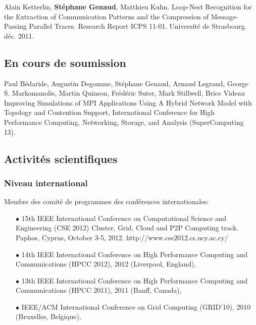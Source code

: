 \documentclass[11pt]{article}
\begin{document}
\begin{thebibliography}{99}
Alain Ketterlin, \textbf{Stéphane Genaud}, Matthieu Kuhn.
\newblock Loop-Nest Recognition for the Extraction of Communication Patterns 
and the Compression of Message-Passing Parallel Traces.
\newblock Research Report ICPS 11-01. Université de Strasbourg. déc. 2011.


\subsection*{En cours de soumission}

Paul Bédaride, Augustin Degomme, Stéphane Genaud, Arnaud Legrand, George S. Markomanolis,
Martin Quinson, Frédéric Suter, Mark Stillwell, Brice Videau
\newblock
Improving Simulations of MPI Applications Using A Hybrid Network Model with Topology and Contention Support,
International Conference for High Performance Computing, Networking, Storage, and Analysis (SuperComputing 13).
\end{thebibliography}


\subsection{Activités scientifiques}

\subsubsection{Niveau international}
Membre des comité de programmes des conférences internationales:\\[-3mm]
\begin{itemize}
\item[$\bullet$]
15th IEEE International Conference on Computational Science and Engineering (CSE 2012) 
Cluster, Grid, Cloud and P2P Computing track. Paphos, Cyprus, October 3-5, 2012. 
http://www.cse2012.cs.ucy.ac.cy/

\item[$\bullet$] 
14th IEEE International Conference on High Performance Computing and Communications (HPCC 2012), 
2012 (Liverpool, England),
\item[$\bullet$] 
13th IEEE International Conference on High Performance Computing and Communications (HPCC 2011), 
2011 (Banff, Canada),
\item[$\bullet$] 
IEEE/ACM International Conference on Grid Computing (GRID'10), 2010 (Bruxelles, Belgique),
\end{itemize}
\end{document}
